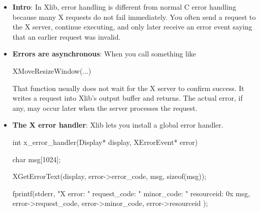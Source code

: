 \documentclass{report}
\begin{document}
    \pagebreak 
    \begin{itemize}
        \item \textbf{Intro}: In Xlib, error handling is different from normal C error handling because many X requests do not fail immediately. You often send a request to the X server, continue executing, and only later receive an error event saying that an earlier request was invalid. 
        \item \textbf{Errors are asynchronous}: When you call something like
            \bigbreak \noindent 
            \begin{cppcode}
            XMoveResizeWindow(...)
            \end{cppcode}
            \bigbreak \noindent 
            That function usually does not wait for the X server to confirm success. It writes a request into Xlib’s output buffer and returns.
            \bigbreak \noindent 
            The actual error, if any, may occur later when the server processes the request.
        \item \textbf{The X error handler}: Xlib lets you install a global error handler.
            \bigbreak \noindent 
            \begin{cppcode}
                int x_error_handler(Display* display, XErrorEvent* error) {
                    char msg[1024];

                    XGetErrorText(display, error->error_code, msg, sizeof(msg));

                    fprintf(stderr,
                        "X error: %
                        "  request_code: %
                        "  minor_code: %
                        "  resourceid: 0x%
                        msg,
                        error->request_code,
                        error->minor_code,
                        error->resourceid
                    );

}
\end{cppcode}
\end{itemize}
\end{document}
